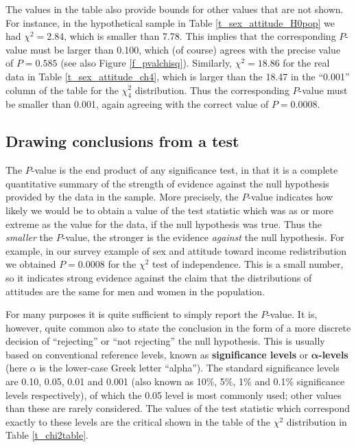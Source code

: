 The values in the table also provide bounds for other
values that are not shown. For instance, in the hypothetical sample in
Table \ref{t_sex_attitude_H0pop} we had $\chi^{2}=2.84$, which is
smaller than 7.78. This implies that the corresponding $P$-value must be
larger than 0.100, which (of course) agrees with the precise value of
$P=0.585$ (see also Figure \ref{f_pvalchisq}). Similarly,
$\chi^{2}=18.86$ for the real
data in Table \ref{t_sex_attitude_ch4}, which
is larger than the 18.47 in the ``0.001'' column of the table for the
$\chi^{2}_{4}$ distribution. Thus the corresponding $P$-value must be
smaller than 0.001, again agreeing with the correct value of $P=0.0008$.

\subsection{Drawing conclusions from a test}
\label{ss_tables_chi2test_conclusions}

The $P$-value is the end product of any significance test, in that it is
a complete quantitative summary of the strength of evidence against the
null hypothesis provided by the data in the sample. More precisely, the
$P$-value indicates how likely we would be to obtain a value of the test
statistic which was as or more extreme as the value for the data, if the
null hypothesis was true. Thus the \emph{smaller} the $P$-value, the
stronger is the evidence \emph{against} the null hypothesis. For
example, in our survey example of sex and attitude toward income
redistribution we obtained $P=0.0008$ for the $\chi^{2}$ test of
independence. This is a small number, so it indicates strong evidence
against the claim that the distributions of attitudes are the same for
men and women in the population.

For many purposes it is quite sufficient to simply report the $P$-value.
It is, however, quite common also to state the conclusion in the form of
a more discrete decision of ``rejecting'' or ``not rejecting'' the null
hypothesis. This is usually based on conventional reference levels,
known as \textbf{significance levels} or
$\boldsymbol{\alpha}$\textbf{-levels}
(here $\alpha$ is the lower-case
Greek letter ``alpha''). The standard significance levels are 0.10,
0.05, 0.01 and 0.001 (also known as 10\%, 5\%, 1\% and 0.1\%
significance levels respectively), of which the 0.05 level is most
commonly used; other values than these are rarely considered. The values of the
test statistic which correspond exactly to these levels are the critical
shown in the table of the $\chi^{2}$ distribution in Table
\ref{t_chi2table}.

